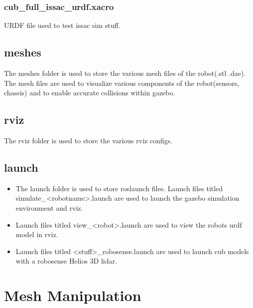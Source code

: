 \documentclass[11pt]{article}
\begin{document}
\subsubsection{cub\_full\_issac\_urdf.xacro}
URDF file used to test issac sim stuff.

\subsection{meshes}
The meshes folder is used to store the various mesh files of the robot(.stl .dae).
The mesh files are used to visualize various components of the robot(sensors, chassis) and to enable accurate collisions within gazebo.

\subsection{rviz}
The rviz folder is used to store the various rviz configs.

\subsection{launch}
\begin{itemize}
 \item{
       
       The launch folder is used to store roslaunch files. Launch files titled simulate\_<robotname>.launch are used to launch the gazebo simulation environment and rviz.
       }
 \item{
       Launch files titled view\_<robot>.launch are used to view the robots urdf model in rviz.
       }
 \item{
       Launch files titled <stuff>\_robosense.launch are used to launch cub models with a robosense Helios 3D lidar.
       }
\end{itemize}



\section{Mesh Manipulation}
\end{document}
